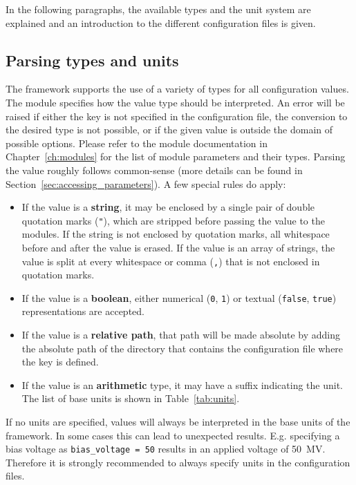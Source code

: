 In the following paragraphs, the available types and the unit system are explained and an introduction to the different configuration files is given.

\subsection{Parsing types and units}
\label{sec:config_values}
The \apsq framework supports the use of a variety of types for all configuration values.
The module specifies how the value type should be interpreted.
An error will be raised if either the key is not specified in the configuration file, the conversion to the desired type is not possible, or if the given value is outside the domain of possible options.
Please refer to the module documentation in Chapter~\ref{ch:modules} for the list of module parameters and their types.
Parsing the value roughly follows common-sense (more details can be found in Section~\ref{sec:accessing_parameters}).
A few special rules do apply:
\begin{itemize}
\item If the value is a \textbf{string}, it may be enclosed by a single pair of double quotation marks (\texttt{"}), which are stripped before passing the value to the modules.
If the string is not enclosed by quotation marks, all whitespace before and after the value is erased.
If the value is an array of strings, the value is split at every whitespace or comma (\texttt{,}) that is not enclosed in quotation marks.
\item If the value is a \textbf{boolean}, either numerical (\texttt{0}, \texttt{1}) or textual (\texttt{false}, \texttt{true}) representations are accepted.
\item If the value is a \textbf{relative path}, that path will be made absolute by adding the absolute path of the directory that contains the configuration file where the key is defined.
\item If the value is an \textbf{arithmetic} type, it may have a suffix indicating the unit.
The list of base units is shown in Table~\ref{tab:units}.
\end{itemize}

\begin{warning}
  If no units are specified, values will always be interpreted in the base units of the framework.
  In some cases this can lead to unexpected results.
  E.g. specifying a bias voltage as \texttt{bias\_voltage = 50} results in an applied voltage of \SI{50}{\mega\volt}.
  Therefore it is strongly recommended to always specify units in the configuration files.
\end{warning}

